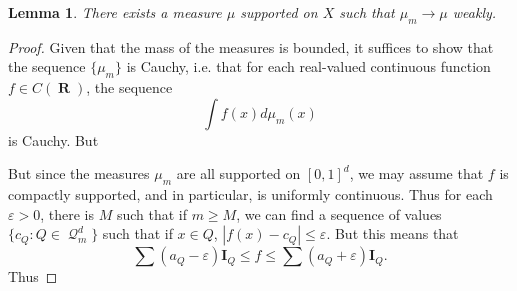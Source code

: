 \documentclass[12pt,reqno]{article}
\numberwithin{equation}{section}
\DeclareMathOperator{\RR}{\mathbf{R}}
\newtheorem{lemma}[theorem]{Lemma}
\DeclareMathOperator{\DQ}{\mathcal{Q}}
\begin{document}
\begin{lemma}
    There exists a measure $\mu$ supported on $X$ such that $\mu_m \to \mu$ weakly.
\end{lemma}
\begin{proof}
    Given that the mass of the measures is bounded, it suffices to show that the sequence $\{ \mu_m \}$ is Cauchy, i.e. that for each real-valued continuous function $f \in C(\RR)$, the sequence
    \[ \int f(x) d\mu_m(x) \]
    is Cauchy. But 


    But since the measures $\mu_m$ are all supported on $[0,1]^d$, we may assume that $f$ is compactly supported, and in particular, is uniformly continuous. Thus for each $\varepsilon > 0$, there is $M$ such that if $m \geq M$, we can find a sequence of values $\{ c_Q: Q \in \DQ_m^d \}$ such that if $x \in Q$, $|f(x) - c_Q| \leq \varepsilon$. But this means that
    \[ \sum (a_Q - \varepsilon) \mathbf{I}_Q \leq f \leq \sum (a_Q + \varepsilon) \mathbf{I}_Q. \]
    Thus
\end{proof}
\end{document}
